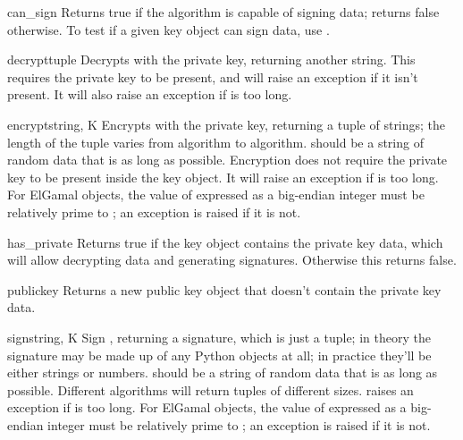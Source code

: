 \documentclass{howto}
\begin{document}
\begin{methoddesc}{can_sign}{}
Returns true if the algorithm is capable of signing data; returns false
otherwise.  To test if a given key object can sign data, use
.
\end{methoddesc}

\begin{methoddesc}{decrypt}{tuple}
Decrypts  with the private key, returning another string.
This requires the private key to be present, and will raise an exception
if it isn't present.  It will also raise an exception if  is
too long.
\end{methoddesc}

\begin{methoddesc}{encrypt}{string, K}
Encrypts  with the private key, returning a tuple of
strings; the length of the tuple varies from algorithm to algorithm.
 should be a string of random data that is as long as
possible.  Encryption does not require the private key to be present
inside the key object.  It will raise an exception if  is
too long.  For ElGamal objects, the value of  expressed as a
big-endian integer must be relatively prime to ; an
exception is raised if it is not.
\end{methoddesc}

\begin{methoddesc}{has_private}{}
Returns true if the key object contains the private key data, which
will allow decrypting data and generating signatures.
Otherwise this returns false.
\end{methoddesc}

\begin{methoddesc}{publickey}{}
Returns a new public key object that doesn't contain the private key
data.
\end{methoddesc}

\begin{methoddesc}{sign}{string, K}
Sign , returning a signature, which is just a tuple; in
theory the signature may be made up of any Python objects at all; in
practice they'll be either strings or numbers.   should be a
string of random data that is as long as possible.  Different algorithms
will return tuples of different sizes.   raises an
exception if  is too long.  For ElGamal objects, the value
of  expressed as a big-endian integer must be relatively prime to
; an exception is raised if it is not.
\end{methoddesc}
\end{document}
